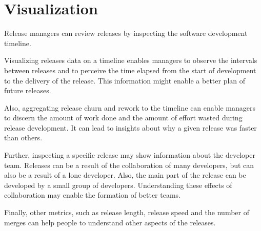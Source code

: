 \documentclass[]{article}
\begin{document}
\section{Visualization}


Release managers can review releases by inspecting the software development timeline. 

Visualizing releases data on a timeline enables managers to observe the intervals between releases and to perceive the time elapsed from the start of development to the delivery of the release. This information might enable a better plan of future releases.

Also, aggregating release churn and rework to the timeline can enable managers to discern the amount of work done and the amount of effort wasted during release development. It can lead to insights about why a given release was faster than others.

Further, inspecting a specific release may show information about the developer team. Releases can be a result of the collaboration of many developers, but can also be a result of a lone developer. Also, the main part of the release can be developed by a small group of developers. Understanding these effects of collaboration may enable the formation of better teams. 

Finally, other metrics, such as release length, release speed and the number of merges can help people to understand other aspects of the releases.
\end{document}
